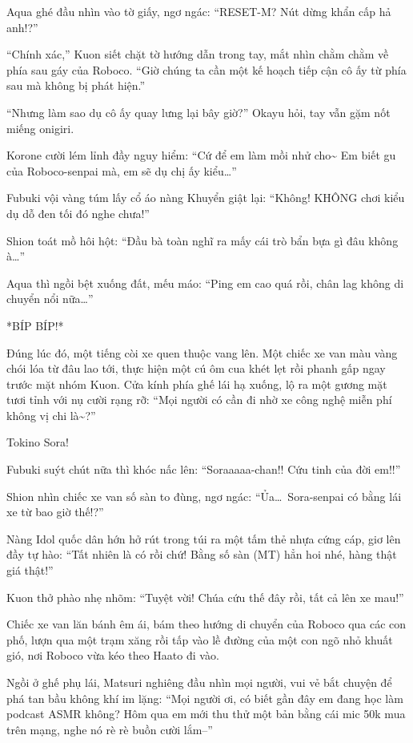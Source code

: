 \documentclass[../main.tex]{subfiles}
\begin{document}
Aqua ghé đầu nhìn vào tờ giấy, ngơ ngác: ``RESET-M? Nút dừng khẩn cấp hả anh!?''

``Chính xác,'' Kuon siết chặt tờ hướng dẫn trong tay, mắt nhìn chằm chằm về phía sau gáy của Roboco. ``Giờ chúng ta cần một kế hoạch tiếp cận cô ấy từ phía sau mà không bị phát hiện.''

``Nhưng làm sao dụ cô ấy quay lưng lại bây giờ?'' Okayu hỏi, tay vẫn gặm nốt miếng onigiri.

Korone cười lém lỉnh đầy nguy hiểm: ``Cứ để em làm mồi nhử cho\~{} Em biết gu của Roboco-senpai mà, em sẽ dụ chị ấy kiểu\dots''

Fubuki vội vàng túm lấy cổ áo nàng Khuyển giật lại: ``Không! KHÔNG chơi kiểu dụ dỗ đen tối đó nghe chưa!''

Shion toát mồ hôi hột: ``Đầu bà toàn nghĩ ra mấy cái trò bẩn bựa gì đâu không à\dots''

Aqua thì ngồi bệt xuống đất, mếu máo: ``Ping em cao quá rồi, chân lag không di chuyển nổi nữa\dots''

*BÍP BÍP!*

Đúng lúc đó, một tiếng còi xe quen thuộc vang lên. Một chiếc xe van màu vàng chói lóa từ đâu lao tới, thực hiện một cú ôm cua khét lẹt rồi phanh gấp ngay trước mặt nhóm Kuon. Cửa kính phía ghế lái hạ xuống, lộ ra một gương mặt tươi tỉnh với nụ cười rạng rỡ: ``Mọi người có cần đi nhờ xe công nghệ miễn phí không vị chi là\~{}?''

Tokino Sora!

Fubuki suýt chút nữa thì khóc nấc lên: ``Soraaaaa-chan!! Cứu tinh của đời em!!''

Shion nhìn chiếc xe van số sàn to đùng, ngơ ngác: ``Ủa\dots\ Sora-senpai có bằng lái xe từ bao giờ thế!?''

Nàng Idol quốc dân hớn hở rút trong túi ra một tấm thẻ nhựa cứng cáp, giơ lên đầy tự hào: ``Tất nhiên là có rồi chứ! Bằng số sàn (MT) hẳn hoi nhé, hàng thật giá thật!''

Kuon thở phào nhẹ nhõm: ``Tuyệt vời! Chúa cứu thế đây rồi, tất cả lên xe mau!''

Chiếc xe van lăn bánh êm ái, bám theo hướng di chuyển của Roboco qua các con phố, lượn qua một trạm xăng rồi tấp vào lề đường của một con ngõ nhỏ khuất gió, nơi Roboco vừa kéo theo Haato đi vào.

Ngồi ở ghế phụ lái, Matsuri nghiêng đầu nhìn mọi người, vui vẻ bắt chuyện để phá tan bầu không khí im lặng: ``Mọi người ơi, có biết gần đây em đang học làm podcast ASMR không? Hôm qua em mới thu thử một bản bằng cái mic 50k mua trên mạng, nghe nó rè rè buồn cười lắm--''
\end{document}
